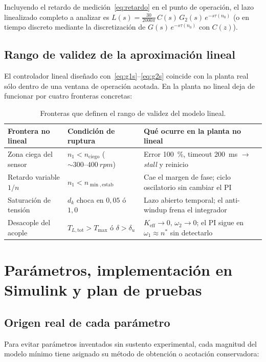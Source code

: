 \documentclass[11pt,a4paper,oneside]{report}
\theoremstyle{definition}
\theoremstyle{remark}
\begin{document}
Incluyendo el retardo de medición~\eqref{eq:retardo} en el punto de operación,
el lazo linealizado completo a analizar es $L(s) = \frac{30}{2000\pi}\,C(s)\,G_2(s)\,e^{-s\tau(n_0)}$
(o en tiempo discreto mediante la discretización de $G(s)\,e^{-s\tau(n_0)}$ con
$C(z)$).

\section{Rango de validez de la aproximación lineal}
El controlador lineal diseñado con~\eqref{eq:g1s}--\eqref{eq:g2s} coincide con la
planta real sólo dentro de una ventana de operación acotada. En la planta no
lineal deja de funcionar por cuatro fronteras concretas:

\begin{table}[h]
\centering
\small
\begin{tabular}{@{}>{\raggedright\arraybackslash}p{3.2cm}>{\raggedright\arraybackslash}p{4.3cm}>{\raggedright\arraybackslash}p{7.3cm}@{}}
\toprule
Frontera no lineal & Condición de ruptura & Qué ocurre en la planta no lineal \\
\midrule
Zona ciega del sensor & $n_1 < n_{\text{ciego}}$ ($\sim 300\text{--}\SI{400}{rpm}$) & Error \SI{100}{\percent}, timeout \SI{200}{ms} $\to$ \emph{stall} y reinicio \\
Retardo variable $1/n$ & $n_1 < n_{\min,\text{estab}}$ & Cae el margen de fase; ciclo oscilatorio sin cambiar el PI \\
Saturación de tensión & $d_k$ choca en $0{,}05$ ó $1{,}0$ & Lazo abierto temporal; el anti-windup frena el integrador \\
Desacople del acople & $T_{L,\text{tot}} > T_{\max}$ ó $\delta > \delta_u$ & $K_{\text{eff}}\to 0$, $\omega_2\to 0$; el PI sigue en $\omega_1\approx n^\ast$ sin detectarlo \\
\bottomrule
\end{tabular}
\caption{Fronteras que definen el rango de validez del modelo lineal.}
\end{table}

\chapter{Parámetros, implementación en Simulink y plan de pruebas}\label{cap:escalar}

\section{Origen real de cada parámetro}
Para evitar parámetros inventados sin sustento experimental, cada magnitud del
modelo mínimo tiene asignado su método de obtención o acotación conservadora:
\end{document}
